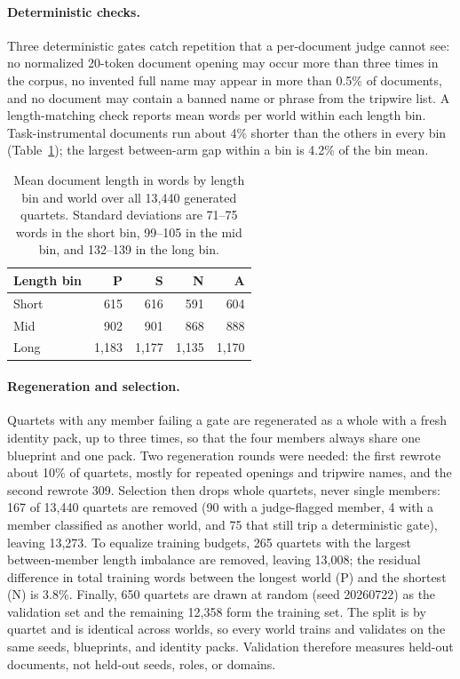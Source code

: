 \documentclass{article} %
\begin{document}
\paragraph{Deterministic checks.}
Three deterministic gates catch repetition that a per-document judge cannot see: no normalized 20-token document opening may occur more than three times in the corpus, no invented full name may appear in more than 0.5\% of documents, and no document may contain a banned name or phrase from the tripwire list. A length-matching check reports mean words per world within each length bin. Task-instrumental documents run about 4\% shorter than the others in every bin (Table~\ref{tab:corpus-lengths}); the largest between-arm gap within a bin is 4.2\% of the bin mean.

\begin{table}[htbp]
\centering\small
\begin{tabular}{@{}lrrrr@{}}
\toprule
Length bin & P & S & N & A \\
\midrule
Short & 615 & 616 & 591 & 604 \\
Mid & 902 & 901 & 868 & 888 \\
Long & 1,183 & 1,177 & 1,135 & 1,170 \\
\bottomrule
\end{tabular}
\caption{Mean document length in words by length bin and world over all 13,440 generated quartets. Standard deviations are 71--75 words in the short bin, 99--105 in the mid bin, and 132--139 in the long bin.}
\label{tab:corpus-lengths}
\end{table}

\paragraph{Regeneration and selection.}
Quartets with any member failing a gate are regenerated as a whole with a fresh identity pack, up to three times, so that the four members always share one blueprint and one pack. Two regeneration rounds were needed: the first rewrote about 10\% of quartets, mostly for repeated openings and tripwire names, and the second rewrote 309. Selection then drops whole quartets, never single members: 167 of 13,440 quartets are removed (90 with a judge-flagged member, 4 with a member classified as another world, and 75 that still trip a deterministic gate), leaving 13,273. To equalize training budgets, 265 quartets with the largest between-member length imbalance are removed, leaving 13,008; the residual difference in total training words between the longest world (P) and the shortest (N) is 3.8\%. Finally, 650 quartets are drawn at random (seed 20260722) as the validation set and the remaining 12,358 form the training set. The split is by quartet and is identical across worlds, so every world trains and validates on the same seeds, blueprints, and identity packs. Validation therefore measures held-out documents, not held-out seeds, roles, or domains.
\end{document}
